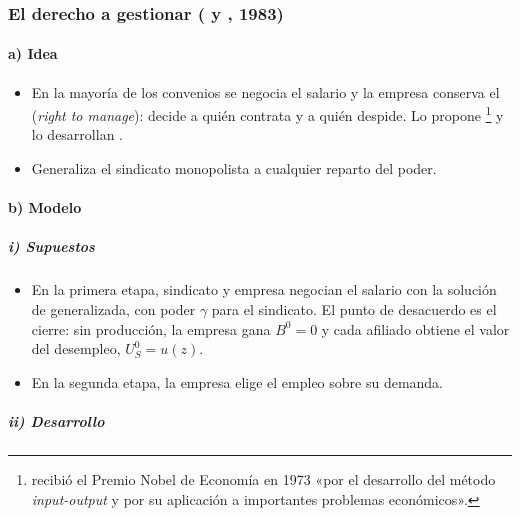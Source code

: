 \documentclass[11pt]{article}
\begin{document}
\subsubsection{El derecho a gestionar ( y , 1983)}\label{sec:derecho-gestionar}

\paragraph{a) Idea}

\begin{itemize}
\item En la mayoría de los convenios se negocia el salario y la empresa conserva el  (\emph{right to manage}): decide a quién contrata y a quién despide. Lo propone \textcite{Leontief1946Pure}\footnote{ recibió el Premio Nobel de Economía en 1973 «por el desarrollo del método \emph{input-output} y por su aplicación a importantes problemas económicos»\nocite{Nobel1973Leontief}.} y lo desarrollan \textcite{NickellAndrews1983Unions}.
\item Generaliza el sindicato monopolista a cualquier reparto del poder.
\end{itemize}

\paragraph{b) Modelo}

\subparagraph{i) Supuestos}

\begin{itemize}
\item En la primera etapa, sindicato y empresa negocian el salario con la solución de  generalizada, con poder $\gamma$ para el sindicato. El punto de desacuerdo es el cierre: sin producción, la empresa gana $B^0=0$ y cada afiliado obtiene el valor del desempleo, $U_S^0=u(z)$.
\item En la segunda etapa, la empresa elige el empleo sobre su demanda.
\end{itemize}

\subparagraph{ii) Desarrollo}
\end{document}

